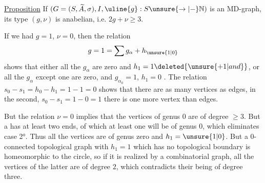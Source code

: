 \uline{Proposition} If $(G=(S,\widetilde A,\sigma),I,\uline{g}:S\unsure{\to|-}\mathbb N)$ is an MD-graph, its type $(g,\nu)$ is anabelian, i.e. $2g+\nu\geq3$.

If we had $g=1$, $\nu=0$, then the relation
\[
g=1=\sum g_\alpha+h_{\unsure{1|0}}
\]
shows that either all the $g_\alpha$ are zero and $h_1=1\deleted{\unsure{+1|and}}$, or all the $g_\alpha$ except one  are zero, and $g_{\alpha_0}=1$, $h_1=0$ .  The relation $s_0-s_1=h_0-h_1=1-1=0$ shows that there are as many vertices as edges, in the second, $s_0-s_1=1-0=1$ there is one more vertex than edges.

But the relation $\nu=0$ implies that the vertices of genus $0$ are of degree $\geq3$.  But a   has at least two ends, of which at least one will be of genus $0$, which eliminates case 2°. Thus all the vertices are of genus zero  and $h_1=\unsure{1|0}$. But  a $0$-connected topological graph with $h_1=1$ which has no  topological boundary is homeomorphic to the circle, so if it is realized by a combinatorial graph, all the vertices of the latter are of degree $2$, which contradicts their being of degree three.
